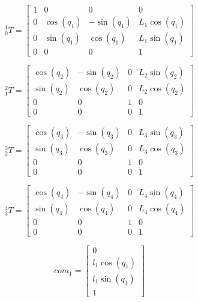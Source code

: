\documentclass{article}
\begin{document}
\begin{equation}
	{}_0^1 T = \begin{bmatrix}
	1 & 0 & 0 & 0\\0 & \cos{\left(q_{1} \right)} & - \sin{\left(q_{1} \right)} & L_{1} \cos{\left(q_{1} 	\right)}\\
	0 & \sin{\left(q_{1} \right)} & \cos{\left(q_{1} \right)} & L_{1} \sin{\left(q_{1} \right)}\\
	0 & 0 & 0 & 1
\end{bmatrix}
\end{equation}

\begin{equation}
	{}_1^2 T = \begin{bmatrix}
 	\cos{\left(q_{2} \right)} & - \sin{\left(q_{2} \right)} & 0 & L_{2} \sin{\left(q_{2} \right)}\\
 	\sin{\left(q_{2} \right)} & \cos{\left(q_{2} \right)} & 0 & L_{2} \cos{\left(q_{2} \right)}\\
 	0 & 0 & 1 & 0\\
 	0 & 0 & 0 & 1
\end{bmatrix}
\end{equation}

\begin{equation}
	{}_2^3 T = \begin{bmatrix}
 	\cos{\left(q_{3} \right)} & - \sin{\left(q_{3} \right)} & 0 & L_{3} \sin{\left(q_{3} \right)}\\\sin{\left(q_{3} \right)} & \cos{\left(q_{3} \right)} & 0 & L_{3} \cos{\left(q_{3} \right)}\\0 & 0 & 1 & 0\\0 & 0 & 0 & 1
\end{bmatrix}
\end{equation}

\begin{equation}
	{}_3^4 T = \begin{bmatrix}
 	\cos{\left(q_{4} \right)} & - \sin{\left(q_{4} \right)} & 0 & L_{4} \sin{\left(q_{4} \right)}\\
 	\sin{\left(q_{4} \right)} & \cos{\left(q_{4} \right)} & 0 & L_{4} \cos{\left(q_{4} \right)}\\
 	0 & 0 & 1 & 0\\
 	0 & 0 & 0 & 1
\end{bmatrix}
\end{equation}

\begin{equation}
	com_1 = \begin{bmatrix}
 	0\\l_{1} \cos{\left(q_{1} \right)}\\l_{1} \sin{\left(q_{1} \right)}\\1
\end{bmatrix}
\end{equation}
\end{document}
